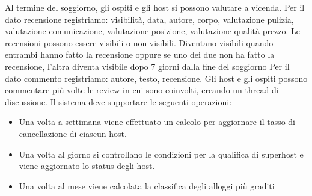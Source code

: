\newline
\newline
Al termine del soggiorno, gli ospiti e gli host si possono valutare a vicenda. 
Per il dato recensione registriamo: visibilità, data, autore, corpo, valutazione pulizia, valutazione comunicazione, valutazione 
posizione, valutazione qualità-prezzo.
\newline
\newline
Le recensioni possono essere visibili o non visibili. Diventano visibili quando
entrambi hanno fatto la recensione oppure se uno dei due non ha fatto la recensione, l’altra
diventa visibile dopo 7 giorni dalla fine del soggiorno
\newline
\newline
Per il dato commento registriamo: autore, testo, recensione.
Gli host e gli ospiti possono commentare più volte le review in cui sono coinvolti, 
creando un thread di discussione.
\newline
\newline
Il sistema deve supportare le seguenti operazioni:
\begin{itemize}
    \item Una volta a settimana viene effettuato un calcolo per aggiornare 
    il tasso di cancellazione di ciascun host.
    \item Una volta al giorno si controllano le condizioni per la qualifica di 
    superhost e viene aggiornato lo status degli host.
    \item Una volta al mese viene calcolata la classifica degli alloggi più graditi
\end{itemize}

